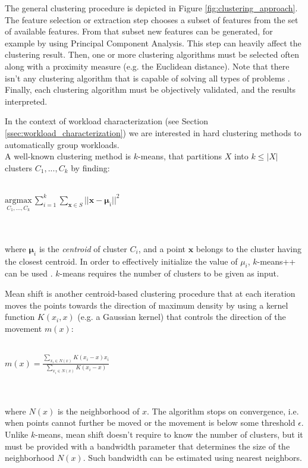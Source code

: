 \documentclass[a4paper, 12pt]{article} %
\begin{document}
	The general clustering procedure is depicted in Figure \ref{fig:clustering_approach}. The feature selection or extraction step chooses a subset of features from the set of available features. From that subset new features can be generated, for example by using Principal Component Analysis. This step can heavily affect the clustering result. Then, one or more clustering algorithms must be selected often along with a proximity measure (e.g. the Euclidean distance). Note that there isn't any clustering algorithm that is capable of solving all types of problems \cite{ImpossibleTheoremForClustering}. Finally, each clustering algorithm must be objectively validated, and the results interpreted.
	
	In the context of workload characterization (see Section \ref{ssec:workload_characterization}) we are interested in hard clustering methods to automatically group workloads. \\
	A well-known clustering method is $k$-means, that partitions $X$ into $k \leq |X|$ clusters $C_1, ..., C_k$ by finding:\\\\
	\centerline{
		$
		\underset{C_1, ..., C_k}{\mathrm{argmax}} \, \sum_{i=1}^{k} \underset{{\pmb{x} \in S}}{\sum} || \pmb{x} - \pmb{\mu}_i ||^2
		$
	} \\\\
	where $\pmb{\mu}_i$ is the \textit{centroid} of cluster $C_i$, and a point $\pmb{x}$ belongs to the cluster having the closest centroid. In order to effectively initialize the value of $\mu_i$, $k$-means++ can be used \cite{kmeans++}. $k$-means requires the number of clusters to be given as input.
	
	Mean shift \cite{MeanShift} is another centroid-based clustering procedure that at each iteration moves the points towards the direction of maximum density by using a kernel function $K(x_i, x)$ (e.g. a Gaussian kernel) that controls the direction of the movement $m(x)$:\\\\
	\centerline{
		$
		m(x) = \frac{\sum_{x_i \in N(x)} K(x_i - x)x_i}{\sum_{x_i \in N(x)} K(x_i - x)}
		$
	} \\\\
	where $N(x)$ is the neighborhood of $x$. The algorithm stops on convergence, i.e. when points cannot further be moved or the movement is below some threshold $\epsilon$. Unlike $k$-means, mean shift doesn't require to know the number of clusters, but it must be provided with a bandwidth parameter that determines the size of the neighborhood $N(x)$. Such bandwidth can be estimated using nearest neighbors.
	
\end{document}
